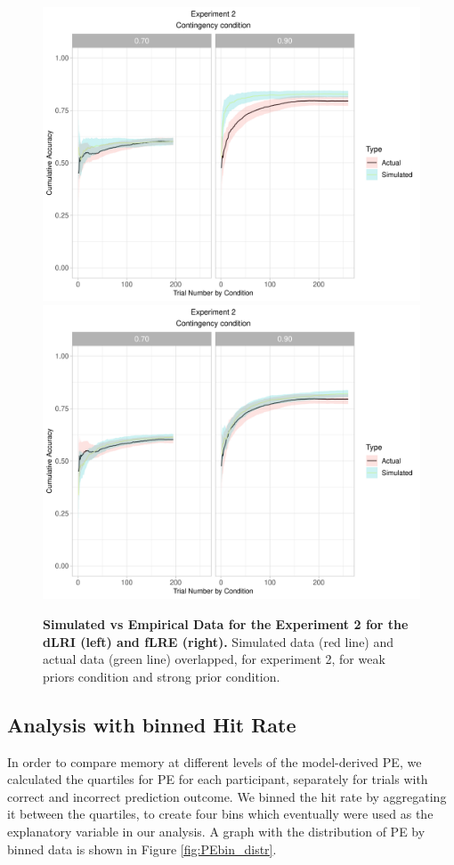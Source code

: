 \documentclass[a4paper,12pt]{article}
\begin{document}
\begin{figure}[ht!]
{\includegraphics{figures/SimulatedVsActual.exp=exp2.mod=dLR_Instr.png}} \vfill
{\includegraphics{figures/SimulatedVsActual.exp=exp2.mod=fLR_Eval.png}}
\caption{\textbf{Simulated vs Empirical Data for the Experiment 2 for the dLRI  (left) and fLRE (right).} Simulated data (red line) and actual data (green line) overlapped, for experiment 2, for weak priors condition and strong prior condition. }
\label{fig:simvsemp_dlr_flrI_exp2}
\end{figure}

\subsection*{Analysis with binned Hit Rate}
In order to compare memory at different levels of the model-derived PE, we calculated the quartiles for PE for each participant, separately for trials with correct and incorrect prediction outcome.
We binned the hit rate by aggregating it between the quartiles, to create four bins which eventually were used as the explanatory variable in our analysis. A graph with the distribution of PE by binned data is shown in Figure \ref{fig:PEbin_distr}.
\end{document}
